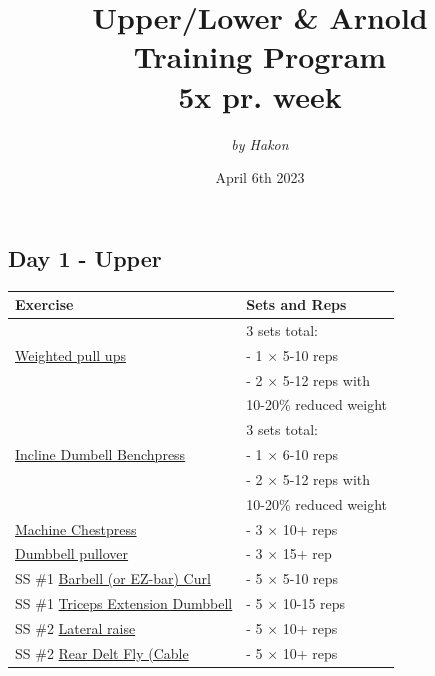 \documentclass[11pt]{article}
\title{\Huge Upper/Lower \& Arnold  \\ Training Program \\ \large 5x pr. week}
\date{April 6th 2023}
\author{\textit{by Hakon}}
\begin{document}
\maketitle
\subsection*{Day 1 - Upper}
\begin{center}
\begin{tabular}{|l|l|}
\hline
\textbf{Exercise} & \textbf{Sets and Reps}\\
\hline
&  3 sets total: \\
\href{https://www.youtube.com/watch?v=eGo4IYlbE5g}{Weighted pull ups} & - 1 $\times$ 5-10 reps \\ 
& - 2  $\times$ 5-12 reps with \\ 
& 10-20\% reduced weight \\ 
\hline
& 3 sets total: \\
\href{https://www.youtube.com/watch?v=0f6-uCUKqgA}{Incline Dumbell Benchpress} & - 1  $\times$ 6-10 reps \\
& - 2  $\times$ 5-12 reps with \\
& 10-20\% reduced weight \\
\hline
\href{https://www.youtube.com/watch?v=dQw4w9WgXcQ}{Machine Chestpress} & - 3 $\times$ 10+ reps \\
\hline
\href{https://www.youtube.com/watch?v=FK4rHfWKEac}{Dumbbell pullover} & - 3 $\times$ 15+ rep\\
\hline
SS \#1  \href{https://www.youtube.com/watch?v=bAWLx7PPK10}{Barbell (or EZ-bar) Curl} & - 5 $\times$ 5-10 reps \\
SS \#1 \href{https://www.youtube.com/watch?v=_gsUck-7M74}{Triceps Extension Dumbbell} & - 5 $\times$ 10-15 reps \\ 
\hline
SS \#2 \href{https://www.youtube.com/watch?v=n5dsI9qQXwY}{Lateral raise} & - 5 $\times$ 10+ reps\\
SS \#2 \href{https://www.youtube.com/watch?v=JENKmsEZQO8}{Rear Delt Fly (Cable} & - 5 $\times$ 10+ reps\\
\hline
\end{tabular}
\end{center}
\end{document}
